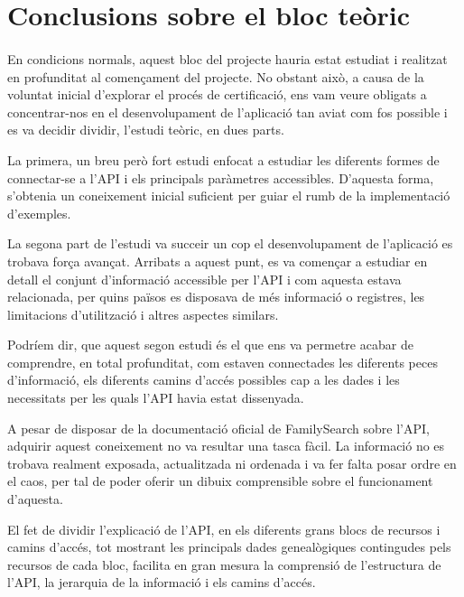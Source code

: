 \section{Conclusions sobre el bloc teòric}

    \paragraph{}

    En condicions normals, aquest bloc del projecte hauria estat estudiat i realitzat en profunditat al començament del projecte. No obstant això, a causa de la voluntat inicial d’explorar el procés de certificació, ens vam veure obligats a concentrar-nos en el desenvolupament de l’aplicació tan aviat com fos possible i es va decidir dividir, l’estudi teòric, en dues parts.

    La primera, un breu però fort estudi enfocat a estudiar les diferents formes de connectar-se a l’API i els principals paràmetres accessibles. D’aquesta forma, s’obtenia un coneixement inicial suficient per guiar el rumb de la implementació d’exemples.

    La segona part de l’estudi va succeir un cop el desenvolupament de l’aplicació es trobava força avançat.  Arribats a aquest punt, es va començar a estudiar en detall el conjunt d’informació accessible per l’API i com aquesta estava relacionada, per quins països es disposava de més informació o registres, les limitacions d’utilització i altres aspectes similars.

    Podríem dir, que aquest segon estudi és el que ens va permetre acabar de comprendre, en total profunditat, com estaven connectades les diferents peces d’informació, els diferents camins d’accés possibles cap a les dades i les necessitats per les quals l’API havia estat dissenyada.

    A pesar de disposar de la documentació oficial de FamilySearch sobre l’API, adquirir aquest coneixement no va resultar una tasca fàcil. La informació no es trobava realment exposada, actualitzada ni ordenada i va fer falta posar ordre en el caos, per tal de poder oferir un dibuix comprensible sobre el funcionament d’aquesta.

    El fet de dividir l’explicació de l’API, en els diferents grans blocs de recursos i camins d’accés, tot mostrant les principals dades genealògiques contingudes pels recursos de cada bloc, facilita en gran mesura la comprensió de l’estructura de l’API, la jerarquia de la informació i els camins d’accés.

